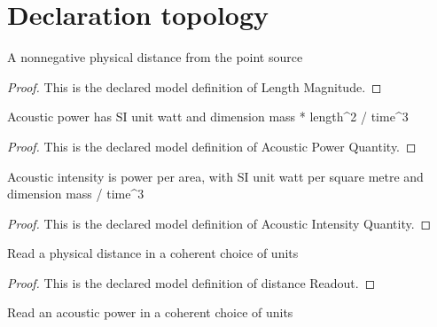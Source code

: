 \section{Declaration topology}
\begin{definition}
  \label{def:physics:phyx-mini-0191:phyxminiproblems-problemphyxmini0191-lengthmagnitude}
  A nonnegative physical distance from the point source
\end{definition}
\begin{proof}
  This is the declared model definition of Length Magnitude.
\end{proof}
\begin{definition}
  \label{def:physics:phyx-mini-0191:phyxminiproblems-problemphyxmini0191-acousticpowerquantity}
  Acoustic power has SI unit watt and dimension mass * length\textasciicircum{}2 / time\textasciicircum{}3
\end{definition}
\begin{proof}
  This is the declared model definition of Acoustic Power Quantity.
\end{proof}
\begin{definition}
  \label{def:physics:phyx-mini-0191:phyxminiproblems-problemphyxmini0191-acousticintensityquantity}
  Acoustic intensity is power per area, with SI unit watt per square metre and dimension mass / time\textasciicircum{}3
\end{definition}
\begin{proof}
  This is the declared model definition of Acoustic Intensity Quantity.
\end{proof}
\begin{definition}
  \label{def:physics:phyx-mini-0191:phyxminiproblems-problemphyxmini0191-distancereadout}
  Read a physical distance in a coherent choice of units
\end{definition}
\begin{proof}
  This is the declared model definition of distance Readout.
\end{proof}
\begin{definition}
  \label{def:physics:phyx-mini-0191:phyxminiproblems-problemphyxmini0191-acousticpowerreadout}
  Read an acoustic power in a coherent choice of units
\end{definition}
